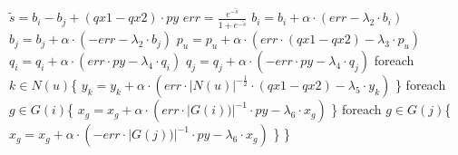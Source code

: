 \documentclass{pracamgr}
\begin{document}
     \hspace*{32pt}		$\tilde{s}=b_i-b_j+(qx1-qx2)\cdot py$\newline   
     \hspace*{32pt}		$err=\frac{e^{-\tilde{s}}}{1+e^{-\tilde{s}}}$\newline
     \hspace*{32pt}		$b_i=b_i+\alpha\cdot(err-\lambda_2\cdot b_i)$\newline     
     \hspace*{32pt}		$b_j=b_j+\alpha\cdot(-err-\lambda_2\cdot b_j)$\newline
     \hspace*{32pt}		$p_u=p_u+\alpha\cdot(err\cdot (qx1-qx2)-\lambda_3\cdot p_u)$\newline
     \hspace*{32pt}		$q_i=q_i+\alpha\cdot(err\cdot py-\lambda_4\cdot q_i)$\newline     
     \hspace*{32pt}		$q_j=q_j+\alpha\cdot(-err\cdot py-\lambda_4\cdot q_j)$\newline
     \hspace*{32pt}		foreach $k\in N(u)$\{\newline
     \hspace*{48pt}			$y_k=y_k+\alpha\cdot(err\cdot |N(u)|^{-\frac{1}{2}}\cdot(qx1-qx2)-\lambda_5\cdot y_k)$\newline
     \hspace*{32pt}		\}\newline    
     \hspace*{32pt}		foreach $g\in G(i)$\{\newline
     \hspace*{48pt}			$x_g=x_g+\alpha\cdot(err\cdot |G(i))|^{-1}\cdot py-\lambda_6\cdot x_g)$\newline
     \hspace*{32pt}		\}\newline
     \hspace*{32pt}		foreach $g\in G(j)$\{\newline
     \hspace*{48pt}			$x_g=x_g+\alpha\cdot(-err\cdot |G(j))|^{-1}\cdot py-\lambda_6\cdot x_g)$\newline
     \hspace*{32pt}		\}\newline
     \hspace*{16pt}	\}\newline
\end{document}
